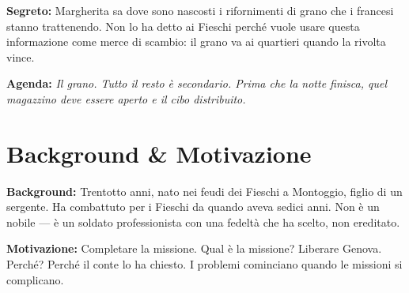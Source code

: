 \clearpage
\begin{secretbox}
\textbf{Segreto:} Margherita sa dove sono nascosti i rifornimenti di grano che i francesi stanno trattenendo. Non lo ha detto ai Fieschi perch\'e vuole usare questa informazione come merce di scambio: il grano va ai quartieri quando la rivolta vince.

\medskip\noindent\textcolor{SecretRed}{\textbf{Agenda:}} \textit{Il grano. Tutto il resto \`e secondario. Prima che la notte finisca, quel magazzino deve essere aperto e il cibo distribuito.}
\end{secretbox}

\clearpage



\section*{Background \& Motivazione}
\begin{rulebox}{}
\textbf{Background:} Trentotto anni, nato nei feudi dei Fieschi a Montoggio, figlio di un sergente. Ha combattuto per i Fieschi da quando aveva sedici anni. Non \`e un nobile --- \`e un soldato professionista con una fedelt\`a che ha scelto, non ereditato.

\medskip\noindent\textcolor{FieschiGreen}{\textbf{Motivazione:}} Completare la missione. Qual \`e la missione? Liberare Genova. Perch\'e? Perch\'e il conte lo ha chiesto. I problemi cominciano quando le missioni si complicano.
\end{rulebox}

